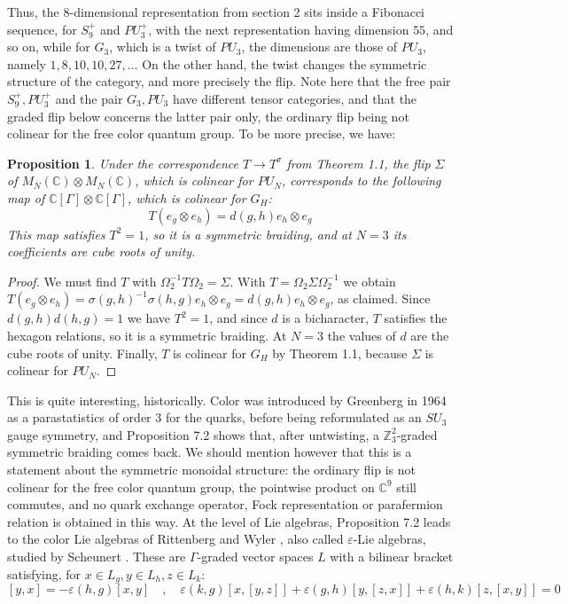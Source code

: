 \documentclass[11pt]{amsart}
\newtheorem{proposition}[theorem]{Proposition}
\theoremstyle{definition}
\begin{document}
Thus, the $8$-dimensional representation from section 2 sits inside a Fibonacci sequence, for $S_9^+$ and $PU_3^+$, with the next representation having dimension $55$, and so on, while for $G_3$, which is a twist of $PU_3$, the dimensions are those of $PU_3$, namely $1,8,10,10,27,\ldots$ On the other hand, the twist changes the symmetric structure of the category, and more precisely the flip. Note here that the free pair $S_9^+,PU_3^+$ and the pair $G_3,PU_3$ have different tensor categories, and that the graded flip below concerns the latter pair only, the ordinary flip being not colinear for the free color quantum group. To be more precise, we have:

\begin{proposition}
Under the correspondence $T\to T^\sigma$ from Theorem 1.1, the flip $\Sigma$ of $M_N(\mathbb C)\otimes M_N(\mathbb C)$, which is colinear for $PU_N$, corresponds to the following map of $\mathbb C[\Gamma]\otimes\mathbb C[\Gamma]$, which is colinear for $G_H$:
$$T(e_g\otimes e_h)=d(g,h)e_h\otimes e_g$$
This map satisfies $T^2=1$, so it is a symmetric braiding, and at $N=3$ its coefficients are cube roots of unity.
\end{proposition}

\begin{proof}
We must find $T$ with $\Omega_2^{-1}T\Omega_2=\Sigma$. With $T=\Omega_2\Sigma\Omega_2^{-1}$ we obtain $T(e_g\otimes e_h)=\sigma(g,h)^{-1}\sigma(h,g)e_h\otimes e_g=d(g,h)e_h\otimes e_g$, as claimed. Since $d(g,h)d(h,g)=1$ we have $T^2=1$, and since $d$ is a bicharacter, $T$ satisfies the hexagon relations, so it is a symmetric braiding. At $N=3$ the values of $d$ are the cube roots of unity. Finally, $T$ is colinear for $G_H$ by Theorem 1.1, because $\Sigma$ is colinear for $PU_N$.
\end{proof}

This is quite interesting, historically. Color was introduced by Greenberg in 1964 \cite{gre} as a parastatistics of order $3$ for the quarks, before being reformulated as an $SU_3$ gauge symmetry, and Proposition 7.2 shows that, after untwisting, a $\mathbb Z_3^2$-graded symmetric braiding comes back. We should mention however that this is a statement about the symmetric monoidal structure: the ordinary flip is not colinear for the free color quantum group, the pointwise product on $\mathbb C^9$ still commutes, and no quark exchange operator, Fock representation or parafermion relation is obtained in this way. At the level of Lie algebras, Proposition 7.2 leads to the color Lie algebras of Rittenberg and Wyler \cite{rwy}, also called $\varepsilon$-Lie algebras, studied by Scheunert \cite{sch}. These are $\Gamma$-graded vector spaces $L$ with a bilinear bracket satisfying, for $x\in L_g,y\in L_h,z\in L_k$:
$$[y,x]=-\varepsilon(h,g)[x,y]\quad,\quad\varepsilon(k,g)[x,[y,z]]+\varepsilon(g,h)[y,[z,x]]+\varepsilon(h,k)[z,[x,y]]=0$$
\end{document}
